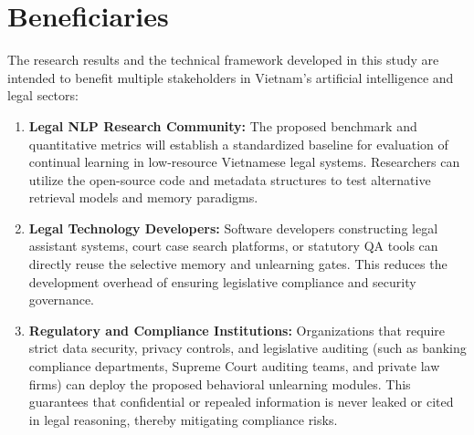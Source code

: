 \section{Beneficiaries}

The research results and the technical framework developed in this study are intended to benefit multiple stakeholders in Vietnam's artificial intelligence and legal sectors:
\begin{enumerate}
    \item \textbf{Legal NLP Research Community:} The proposed benchmark and quantitative metrics will establish a standardized baseline for evaluation of continual learning in low-resource Vietnamese legal systems. Researchers can utilize the open-source code and metadata structures to test alternative retrieval models and memory paradigms.
    \item \textbf{Legal Technology Developers:} Software developers constructing legal assistant systems, court case search platforms, or statutory QA tools can directly reuse the selective memory and unlearning gates. This reduces the development overhead of ensuring legislative compliance and security governance.
    \item \textbf{Regulatory and Compliance Institutions:} Organizations that require strict data security, privacy controls, and legislative auditing (such as banking compliance departments, Supreme Court auditing teams, and private law firms) can deploy the proposed behavioral unlearning modules. This guarantees that confidential or repealed information is never leaked or cited in legal reasoning, thereby mitigating compliance risks.
\end{enumerate}
